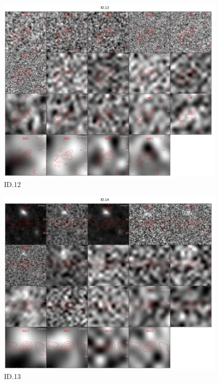 \begin{figure}[tbp]
\centering \includegraphics[width=120mm]{Matched/ASPECS_Cutout_12.jpg}
\caption{ID.12}
\label{fig:Match_Three}
\end{figure}

\begin{figure}[tbp]
\centering \includegraphics[width=120mm]{Matched/ASPECS_Cutout_13.jpg}
\caption{ID.13}
\label{fig:Match_Three}
\end{figure}


